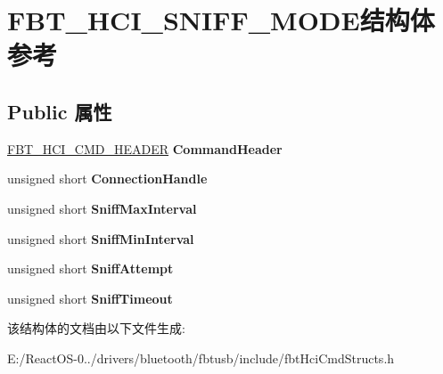 \hypertarget{struct_f_b_t___h_c_i___s_n_i_f_f___m_o_d_e}{}\section{F\+B\+T\+\_\+\+H\+C\+I\+\_\+\+S\+N\+I\+F\+F\+\_\+\+M\+O\+D\+E结构体 参考}
\label{struct_f_b_t___h_c_i___s_n_i_f_f___m_o_d_e}
\subsection*{Public 属性}
\begin{DoxyCompactItemize}
\item 
\mbox{\label{struct_f_b_t___h_c_i___s_n_i_f_f___m_o_d_e_adc459cefcd670e04f3cf9d079e625671}} 
\hyperlink{struct_f_b_t___h_c_i___c_m_d___h_e_a_d_e_r}{F\+B\+T\+\_\+\+H\+C\+I\+\_\+\+C\+M\+D\+\_\+\+H\+E\+A\+D\+ER} {\bfseries Command\+Header}
\item 
\mbox{\label{struct_f_b_t___h_c_i___s_n_i_f_f___m_o_d_e_ad45859a71ce90f07ca89d7db8c3827a5}} 
unsigned short {\bfseries Connection\+Handle}
\item 
\mbox{\label{struct_f_b_t___h_c_i___s_n_i_f_f___m_o_d_e_aa0e90a897a9044c1dc57ee56ce06c243}} 
unsigned short {\bfseries Sniff\+Max\+Interval}
\item 
\mbox{\label{struct_f_b_t___h_c_i___s_n_i_f_f___m_o_d_e_a50a5db55677c5928bef0833314084a43}} 
unsigned short {\bfseries Sniff\+Min\+Interval}
\item 
\mbox{\label{struct_f_b_t___h_c_i___s_n_i_f_f___m_o_d_e_aa23bd88db7dcc278aa27bcac8199477f}} 
unsigned short {\bfseries Sniff\+Attempt}
\item 
\mbox{\label{struct_f_b_t___h_c_i___s_n_i_f_f___m_o_d_e_a6296a6bd6f75363967dc5d6ff6f1ab3b}} 
unsigned short {\bfseries Sniff\+Timeout}
\end{DoxyCompactItemize}


该结构体的文档由以下文件生成\+:\begin{DoxyCompactItemize}
\item 
E\+:/\+React\+O\+S-\/0../drivers/bluetooth/fbtusb/include/fbt\+Hci\+Cmd\+Structs.\+h\end{DoxyCompactItemize}
